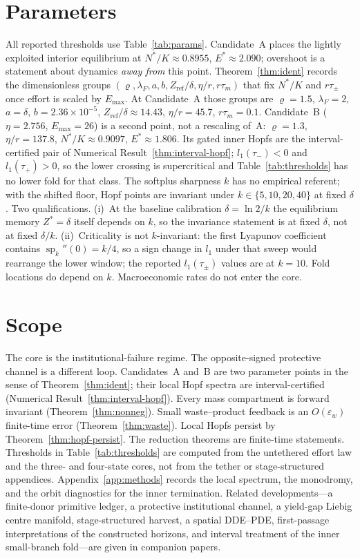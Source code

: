 \documentclass[11pt]{article}
\theoremstyle{definition}
\begin{document}
\section{Parameters}
\label{sec:parameter-audit}

All reported thresholds use Table~\ref{tab:params}. Candidate~A places the lightly exploited interior equilibrium at $N^*/K\approx 0.8955$, $E^*\approx 2.090$; overshoot is a statement about dynamics \emph{away from} this point. Theorem~\ref{thm:ident} records the dimensionless groups $(\varrho,\lambda_F,a,b,Z_{\mathrm{ref}}/\delta,\eta/r,r\tau_m)$ that fix $N^*/K$ and $r\tau_\pm$ once effort is scaled by $E_{\max}$. At Candidate~A those groups are $\varrho=1.5$, $\lambda_F=2$, $a=\delta$, $b=2.36\times 10^{-5}$, $Z_{\mathrm{ref}}/\delta\approx 14.43$, $\eta/r=45.7$, $r\tau_m=0.1$. Candidate~B ($\eta=2.756$, $E_{\max}=26$) is a second point, not a rescaling of~A: $\varrho=1.3$, $\eta/r=137.8$, $N^*/K\approx 0.9097$, $E^*\approx 1.806$. Its gated inner Hopfs are the interval-certified pair of Numerical Result~\ref{thm:interval-hopf}; $l_1(\tau_-)<0$ and $l_1(\tau_+)>0$, so the lower crossing is supercritical and Table~\ref{tab:thresholds} has no lower fold for that class. The softplus sharpness $k$ has no empirical referent; with the shifted floor, Hopf points are invariant under $k\in\{5,10,20,40\}$ at fixed $\delta$. Two qualifications. (i)~At the baseline calibration $\delta=\ln 2/k$ the equilibrium memory $Z^*=\delta$ itself depends on $k$, so the invariance statement is at fixed $\delta$, not at fixed $\delta/k$. (ii)~Criticality is not $k$-invariant: the first Lyapunov coefficient contains $\operatorname{sp}_k''(0)=k/4$, so a sign change in $l_1$ under that sweep would rearrange the lower window; the reported $l_1(\tau_\pm)$ values are at $k=10$. Fold locations do depend on $k$. Macroeconomic rates do not enter the core.

\section{Scope}

The core is the institutional-failure regime. The opposite-signed protective channel is a different loop. Candidates~A and~B are two parameter points in the sense of Theorem~\ref{thm:ident}; their local Hopf spectra are interval-certified (Numerical Result~\ref{thm:interval-hopf}). Every mass compartment is forward invariant (Theorem~\ref{thm:nonneg}). Small waste--product feedback is an $O(\varepsilon_w)$ finite-time error (Theorem~\ref{thm:waste}). Local Hopfs persist by Theorem~\ref{thm:hopf-persist}. The reduction theorems are finite-time statements. Thresholds in Table~\ref{tab:thresholds} are computed from the untethered effort law and the three- and four-state cores, not from the tether or stage-structured appendices. Appendix~\ref{app:methods} records the local spectrum, the monodromy, and the orbit diagnostics for the inner termination. Related developments---a finite-donor primitive ledger, a protective institutional channel, a yield-gap Liebig centre manifold, stage-structured harvest, a spatial DDE--PDE, first-passage interpretations of the constructed horizons, and interval treatment of the inner small-branch fold---are given in companion papers.
\end{document}
